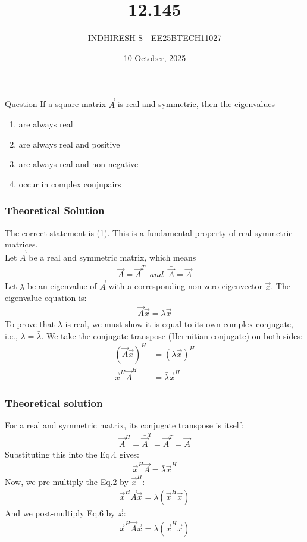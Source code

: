 \documentclass{beamer}
\title %
    {12.145}
\date{10 October, 2025}
\author %
    {INDHIRESH S - EE25BTECH11027}
\begin{document}
    
    \frame{\titlepage}
    
    \begin{frame}{Question}
    If a square matrix $\Vec{A}$ is real and symmetric, then the eigenvalues
\begin{enumerate}
    \item are always real
    \item  are always real and positive
    \item are always real and non-negative
    \item occur in complex conjupairs
\end{enumerate}
    \end{frame}
    
    
    \begin{frame}
    \frametitle{Theoretical Solution}
   The correct statement is (1). This is a fundamental property of real symmetric matrices.\\
Let $\Vec{A}$ be a real and symmetric matrix, which means
\begin{align}
\Vec{A} = \Vec{A}^T\;\; and\;\; \bar{\Vec{A}} = \Vec{A}
\end{align}
Let $\lambda$ be an eigenvalue of $\Vec{A}$ with a corresponding non-zero eigenvector $\Vec{x}$. The eigenvalue equation is:
\begin{align}
    \Vec{A}\Vec{x} = \lambda\Vec{x}
\end{align}
To prove that $\lambda$ is real, we must show it is equal to its own complex conjugate, i.e., $\lambda = \bar{\lambda}$.
We take the conjugate transpose (Hermitian conjugate) on both sides:
\begin{align}
    (\Vec{A}\Vec{x})^H &= (\lambda\Vec{x})^H \\
    \Vec{x}^H \Vec{A}^H &= \bar{\lambda}\Vec{x}^H
\end{align}


    \end{frame}
    
    \begin{frame}
    \frametitle{Theoretical solution}
 For a real and symmetric matrix, its conjugate transpose is itself:
\begin{align}
    \Vec{A}^H = \bar{\Vec{A}}^T = \Vec{A}^T = \Vec{A}
\end{align}
Substituting this into the Eq.4 gives:
\begin{align}
    \Vec{x}^H \Vec{A} = \bar{\lambda}\Vec{x}^H \label{eq:conj}
\end{align}
Now, we pre-multiply the Eq.2 by $\Vec{x}^H$:
\begin{align}
    \Vec{x}^H \Vec{A}\Vec{x} = \lambda(\Vec{x}^H\Vec{x}) \label{eq:pre}
\end{align}
And we post-multiply Eq.6 by $\Vec{x}$:
\begin{align}
    \Vec{x}^H \Vec{A}\Vec{x} = \bar{\lambda}(\Vec{x}^H\Vec{x}) \label{eq:post}
\end{align}

    \end{frame}
\end{document}
